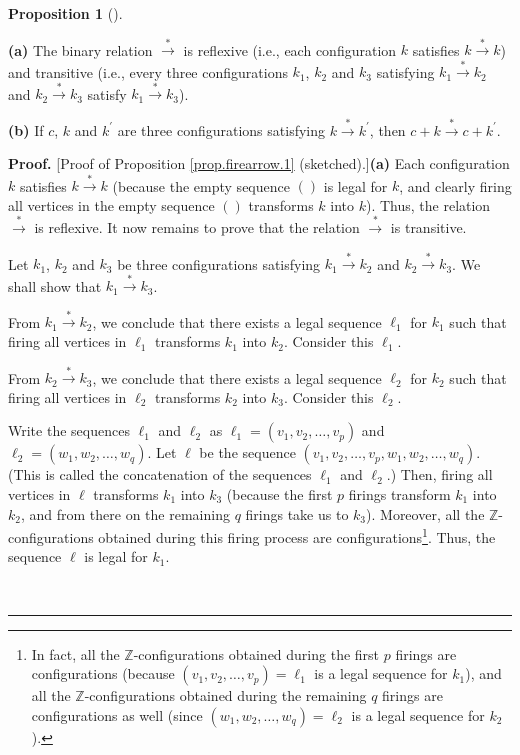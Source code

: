 \documentclass[numbers=enddot,12pt,final,onecolumn,notitlepage]{scrartcl}%
\theoremstyle{definition}
\newtheorem{prop}[theo]{Proposition}
\newenvironment{proposition}[1][]
{\begin{prop}[#1]\begin{leftbar}}
{\end{leftbar}\end{prop}}
\newenvironment{proof}[1][Proof]{\noindent\textbf{#1.} }{\ \rule{0.5em}{0.5em}}
\begin{document}
\begin{proposition}
\label{prop.firearrow.1}\textbf{(a)} The binary relation $\overset{\ast
}{\rightarrow}$ is reflexive (i.e., each configuration $k$ satisfies
$k\overset{\ast}{\rightarrow}k$) and transitive (i.e., every three
configurations $k_{1}$, $k_{2}$ and $k_{3}$ satisfying $k_{1}\overset{\ast
}{\rightarrow}k_{2}$ and $k_{2}\overset{\ast}{\rightarrow}k_{3}$ satisfy
$k_{1}\overset{\ast}{\rightarrow}k_{3}$).

\textbf{(b)} If $c$, $k$ and $k^{\prime}$ are three configurations satisfying
$k\overset{\ast}{\rightarrow}k^{\prime}$, then $c+k\overset{\ast}{\rightarrow
}c+k^{\prime}$.
\end{proposition}

\begin{proof}
[Proof of Proposition \ref{prop.firearrow.1} (sketched).]\textbf{(a)} Each
configuration $k$ satisfies $k\overset{\ast}{\rightarrow}k$ (because the empty
sequence $\left(  {}\right)  $ is legal for $k$, and clearly firing all
vertices in the empty sequence $\left(  {}\right)  $ transforms $k$ into $k$).
Thus, the relation $\overset{\ast}{\rightarrow}$ is reflexive. It now remains
to prove that the relation $\overset{\ast}{\rightarrow}$ is transitive.

Let $k_{1}$, $k_{2}$ and $k_{3}$ be three configurations satisfying
$k_{1}\overset{\ast}{\rightarrow}k_{2}$ and $k_{2}\overset{\ast}{\rightarrow
}k_{3}$. We shall show that $k_{1}\overset{\ast}{\rightarrow}k_{3}$.

From $k_{1}\overset{\ast}{\rightarrow}k_{2}$, we conclude that there exists a
legal sequence $\ell_{1}$ for $k_{1}$ such that firing all vertices in
$\ell_{1}$ transforms $k_{1}$ into $k_{2}$. Consider this $\ell_{1}$.

From $k_{2}\overset{\ast}{\rightarrow}k_{3}$, we conclude that there exists a
legal sequence $\ell_{2}$ for $k_{2}$ such that firing all vertices in
$\ell_{2}$ transforms $k_{2}$ into $k_{3}$. Consider this $\ell_{2}$.

Write the sequences $\ell_{1}$ and $\ell_{2}$ as $\ell_{1}=\left(  v_{1}%
,v_{2},\ldots,v_{p}\right)  $ and $\ell_{2}=\left(  w_{1},w_{2},\ldots
,w_{q}\right)  $. Let $\ell$ be the sequence $\left(  v_{1},v_{2},\ldots
,v_{p},w_{1},w_{2},\ldots,w_{q}\right)  $. (This is called the concatenation
of the sequences $\ell_{1}$ and $\ell_{2}$.) Then, firing all vertices in
$\ell$ transforms $k_{1}$ into $k_{3}$ (because the first $p$ firings
transform $k_{1}$ into $k_{2}$, and from there on the remaining $q$ firings
take us to $k_{3}$). Moreover, all the $\mathbb{Z}$-configurations obtained
during this firing process are configurations\footnote{In fact, all the
$\mathbb{Z}$-configurations obtained during the first $p$ firings are
configurations (because $\left(  v_{1},v_{2},\ldots,v_{p}\right)  =\ell_{1}$
is a legal sequence for $k_{1}$), and all the $\mathbb{Z}$-configurations
obtained during the remaining $q$ firings are configurations as well (since
$\left(  w_{1},w_{2},\ldots,w_{q}\right)  =\ell_{2}$ is a legal sequence for
$k_{2}$).}. Thus, the sequence $\ell$ is legal for $k_{1}$.


\end{proof}
\end{document}
